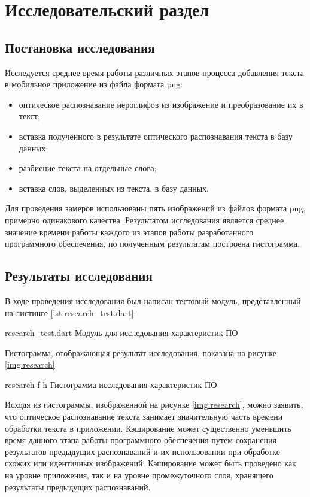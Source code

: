 \chapter{Исследовательский раздел}

\section{Постановка исследования}

Исследуется среднее время работы различных этапов процесса добавления текста в мобильное приложение из файла формата png:

\begin{itemize}[label=---]
    \item оптическое распознавание иероглифов из изображение и преобразование их в текст;
    \item вставка полученного в результате оптического распознавания текста в базу данных;
    \item разбиение текста на отдельные слова;
    \item вставка слов, выделенных из текста, в базу данных.
\end{itemize}

Для проведения замеров использованы пять изображений из файлов формата png, примерно одинакового качества. Результатом исследования является среднее значение времени работы каждого из этапов работы разработанного программного обеспечения, по полученным результатам построена гистограмма.

\clearpage

\section{Результаты исследования}

В ходе проведения исследования был написан тестовый модуль, представленный на листинге \ref{lst:research_test.dart}.

    {research_test.dart}
    {Модуль для исследования характеристик ПО}

\clearpage

Гистограмма, отображающая результат исследования, показана на рисунке \ref{img:research}

    {research}
    {f}
    {h}
    {\linewidth}
    {Гистограмма исследования характеристик ПО}

Исходя из гистограммы, изображенной на рисунке \ref{img:research}, можно заявить, что оптическое распознавание текста занимает значительную часть времени обработки текста в приложении. Кэширование может существенно уменьшить время данного этапа работы программного обеспечения путем сохранения результатов предыдущих распознаваний и их использовании при обработке схожих или идентичных изображений. Кэширование может быть проведено как на уровне приложения, так и на уровне промежуточного слоя, хранящего результаты предыдущих распознаваний.

